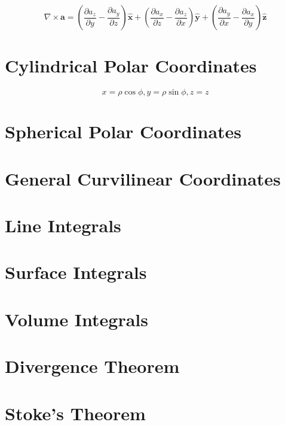 \begin{equation*}
    \nabla \times \boldsymbol{a} = 
    \left(\frac{\partial a_z}{\partial y} - \frac{\partial a_y}{\partial z}\right)\boldsymbol{\hat{x}} + 
    \left(\frac{\partial a_x}{\partial z} - \frac{\partial a_z}{\partial x}\right)\boldsymbol{\hat{y}} + 
    \left(\frac{\partial a_y}{\partial x} - \frac{\partial a_x}{\partial y}\right)\boldsymbol{\hat{z}}
\end{equation*}

\section{Cylindrical Polar Coordinates}

\[ x = \rho\cos\phi, y = \rho\sin\phi, z = z\]

\section{Spherical Polar Coordinates}

\section{General Curvilinear Coordinates}

\section{Line Integrals}

\section{Surface Integrals}

\section{Volume Integrals}

\section{Divergence Theorem}

\section{Stoke's Theorem}